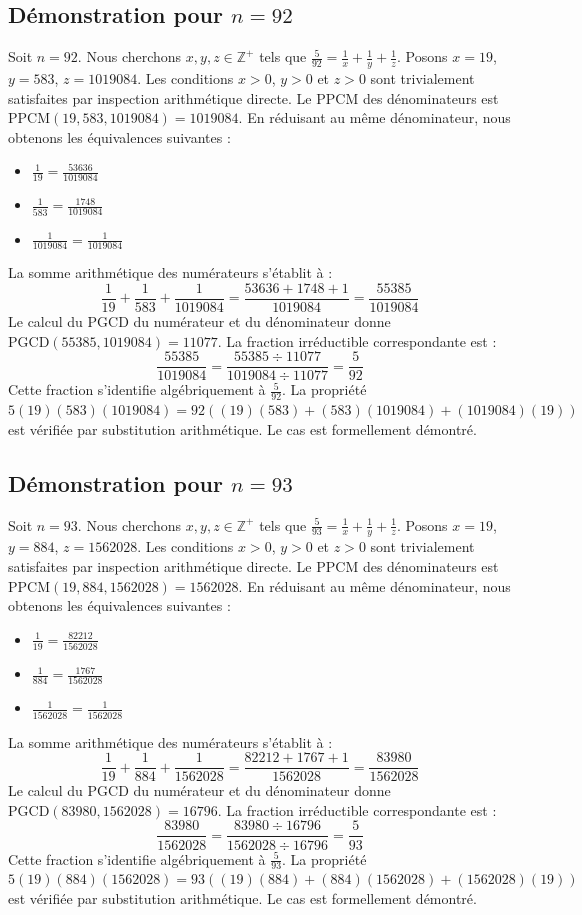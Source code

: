 \documentclass[12pt,a4paper]{article}
\begin{document}
\subsection{Démonstration pour $n = 92$}
Soit $n = 92$. Nous cherchons $x, y, z \in \mathbb{Z}^{+}$ tels que $\frac{5}{92} = \frac{1}{x} + \frac{1}{y} + \frac{1}{z}$.
Posons $x = 19$, $y = 583$, $z = 1019084$.
Les conditions $x > 0$, $y > 0$ et $z > 0$ sont trivialement satisfaites par inspection arithmétique directe.
Le PPCM des dénominateurs est $\text{PPCM}(19, 583, 1019084) = 1019084$.
En réduisant au même dénominateur, nous obtenons les équivalences suivantes :
\begin{itemize}
    \item $\frac{1}{19} = \frac{53636}{1019084}$
    \item $\frac{1}{583} = \frac{1748}{1019084}$
    \item $\frac{1}{1019084} = \frac{1}{1019084}$
\end{itemize}
La somme arithmétique des numérateurs s'établit à :
$$ \frac{1}{19} + \frac{1}{583} + \frac{1}{1019084} = \frac{53636 + 1748 + 1}{1019084} = \frac{55385}{1019084} $$
Le calcul du PGCD du numérateur et du dénominateur donne $\text{PGCD}(55385, 1019084) = 11077$.
La fraction irréductible correspondante est :
$$ \frac{55385}{1019084} = \frac{55385 \div 11077}{1019084 \div 11077} = \frac{5}{92} $$
Cette fraction s'identifie algébriquement à $\frac{5}{92}$.
La propriété $5(19)(583)(1019084) = 92((19)(583) + (583)(1019084) + (1019084)(19))$ est vérifiée par substitution arithmétique.
Le cas est formellement démontré.

\subsection{Démonstration pour $n = 93$}
Soit $n = 93$. Nous cherchons $x, y, z \in \mathbb{Z}^{+}$ tels que $\frac{5}{93} = \frac{1}{x} + \frac{1}{y} + \frac{1}{z}$.
Posons $x = 19$, $y = 884$, $z = 1562028$.
Les conditions $x > 0$, $y > 0$ et $z > 0$ sont trivialement satisfaites par inspection arithmétique directe.
Le PPCM des dénominateurs est $\text{PPCM}(19, 884, 1562028) = 1562028$.
En réduisant au même dénominateur, nous obtenons les équivalences suivantes :
\begin{itemize}
    \item $\frac{1}{19} = \frac{82212}{1562028}$
    \item $\frac{1}{884} = \frac{1767}{1562028}$
    \item $\frac{1}{1562028} = \frac{1}{1562028}$
\end{itemize}
La somme arithmétique des numérateurs s'établit à :
$$ \frac{1}{19} + \frac{1}{884} + \frac{1}{1562028} = \frac{82212 + 1767 + 1}{1562028} = \frac{83980}{1562028} $$
Le calcul du PGCD du numérateur et du dénominateur donne $\text{PGCD}(83980, 1562028) = 16796$.
La fraction irréductible correspondante est :
$$ \frac{83980}{1562028} = \frac{83980 \div 16796}{1562028 \div 16796} = \frac{5}{93} $$
Cette fraction s'identifie algébriquement à $\frac{5}{93}$.
La propriété $5(19)(884)(1562028) = 93((19)(884) + (884)(1562028) + (1562028)(19))$ est vérifiée par substitution arithmétique.
Le cas est formellement démontré.
\end{document}
